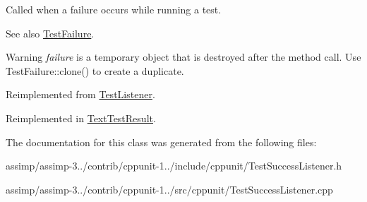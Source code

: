 Called when a failure occurs while running a test. 

\begin{DoxySeeAlso}{See also}
\hyperlink{class_test_failure}{Test\+Failure}. 
\end{DoxySeeAlso}
\begin{DoxyWarning}{Warning}
{\itshape failure} is a temporary object that is destroyed after the method call. Use Test\+Failure\+::clone() to create a duplicate. 
\end{DoxyWarning}


Reimplemented from \hyperlink{class_test_listener_a103216a5814c907f7b752b969477e765}{Test\+Listener}.



Reimplemented in \hyperlink{class_text_test_result_a05d3b0e8e51b3430092166bbc3d17708}{Text\+Test\+Result}.



The documentation for this class was generated from the following files\+:\begin{DoxyCompactItemize}
\item 
assimp/assimp-\/3../contrib/cppunit-\/1../include/cppunit/Test\+Success\+Listener.\+h\item 
assimp/assimp-\/3../contrib/cppunit-\/1../src/cppunit/Test\+Success\+Listener.\+cpp\end{DoxyCompactItemize}
